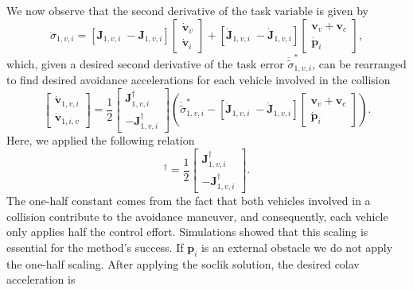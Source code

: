 We now observe that the second derivative of the task variable is given by
\begin{equation}
    \ddot{\sigma}_{1,v,i} = [\mathbf{J}_{1,v,i} \; -\mathbf{J}_{1,v,i}]\begin{bmatrix}
        \dot{\mathbf{v}}_v\\
        \dot{\mathbf{v}}_i
    \end{bmatrix}  + [\dot{\mathbf{J}}_{1,v,i} \; -\dot{\mathbf{J}}_{1,v,i}] \begin{bmatrix}
        \mathbf{v}_v + \mathbf{v}_c\\
        \dot{\mathbf{p}}_i
    \end{bmatrix},
\end{equation}
which, given a desired second derivative of the task error $\ddot{\tilde{\sigma}}^*_{1,v,i}$, can be rearranged to find desired avoidance accelerations for each vehicle involved in the collision\enlargethispage*{\baselineskip}
\begin{equation}
    \begin{bmatrix}
        \dot{\mathbf{v}}_{1,v,i}\\
        \dot{\mathbf{v}}_{1,i,v}
    \end{bmatrix} = \frac{1}{2}\begin{bmatrix}
        \mathbf{J}_{1,v,i}^\dagger\\
        -\mathbf{J}_{1,v,i}^\dagger
    \end{bmatrix}\left(\ddot{\tilde{\sigma}}^*_{1,v,i} - [\dot{\mathbf{J}}_{1,v,i} \; -\dot{\mathbf{J}}_{1,v,i}] \begin{bmatrix}
        \mathbf{v}_v + \mathbf{v}_c\\
        \dot{\mathbf{p}}_i
    \end{bmatrix} \right).
\end{equation}
Here, we applied the following relation
\begin{equation}
    [\mathbf{J}_{1,v,i} \; -\mathbf{J}_{1,v,i}]^\dagger = \frac{1}{2}\begin{bmatrix}
        \mathbf{J}_{1,v,i}^\dagger\\
        -\mathbf{J}_{1,v,i}^\dagger
    \end{bmatrix}.
\end{equation}
The one-half constant comes from the fact that both vehicles involved in a collision contribute to the avoidance maneuver, and consequently, each vehicle only applies half the control effort. Simulations showed that this scaling is essential for the method's success. If $\mathbf{p}_i$ is an external obstacle we do not apply the one-half scaling. After applying the \gls{soclik} solution, the desired \gls{colav} acceleration is
